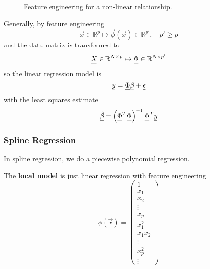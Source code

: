 \begin{figure}[!htb]
 \centering
 \hfill
 \caption{Feature engineering for a non-linear relationship.}
 \label{fig:nonlinear_feature_engineering}
\end{figure}

Generally, by feature engineering
\begin{equation}
    \vec{x} \in \mathbb{R}^p \mapsto \vec{\phi}(\vec{x}) \in \mathbb{R}^{p'}, \quad p' \geq p
\end{equation}
and the data matrix is transformed to
\begin{equation}
    \mat{X} \in \mathbb{R}^{N \times p} \mapsto \mat{\Phi} \in \mathbb{R}^{N \times p'}
\end{equation}
so the linear regression model is
\begin{equation}
    \vec{y} = \mat{\Phi} \vec{\beta} + \vec{\epsilon}
\end{equation}
with the least squares estimate
\begin{equation}
    \vec{\hat{\beta}} = \left( \mat{\Phi}^T \mat{\Phi} \right)^{-1} \mat{\Phi}^T \vec{y}
\end{equation}


\subsubsection{Spline Regression}
In spline regression, we do a piecewise polynomial regression.

The \textbf{local model} is just linear regression with feature engineering
\begin{equation}
    \phi(\vec{x}) = \begin{pmatrix}
        1 \\ x_1 \\ x_2 \\ \vdots \\ x_p \\ x_1^2 \\ x_1 x_2 \\ \vdots \\ x_p^2 \\ \vdots
    \end{pmatrix}
\end{equation}

